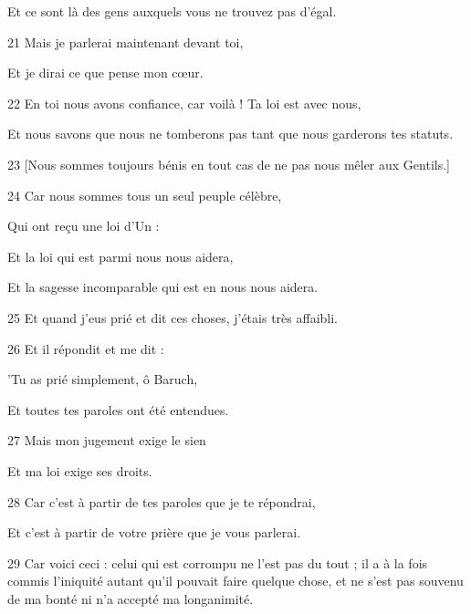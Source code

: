 \par Et ce sont là des gens auxquels vous ne trouvez pas d'égal.

\par 21 Mais je parlerai maintenant devant toi,

\par Et je dirai ce que pense mon cœur.

\par 22 En toi nous avons confiance, car voilà ! Ta loi est avec nous,

\par Et nous savons que nous ne tomberons pas tant que nous garderons tes statuts.

\par 23 [Nous sommes toujours bénis en tout cas de ne pas nous mêler aux Gentils.]

\par 24 Car nous sommes tous un seul peuple célèbre,

\par Qui ont reçu une loi d'Un :

\par Et la loi qui est parmi nous nous aidera,

\par Et la sagesse incomparable qui est en nous nous aidera.

\par 25 Et quand j'eus prié et dit ces choses, j'étais très affaibli.

\par 26 Et il répondit et me dit :

\par 'Tu as prié simplement, ô Baruch,

\par Et toutes tes paroles ont été entendues.

\par 27 Mais mon jugement exige le sien

\par Et ma loi exige ses droits.

\par 28 Car c'est à partir de tes paroles que je te répondrai,

\par Et c'est à partir de votre prière que je vous parlerai.

\par 29 Car voici ceci : celui qui est corrompu ne l'est pas du tout ; il a à la fois commis l'iniquité autant qu'il pouvait faire quelque chose, et ne s'est pas souvenu de ma bonté ni n'a accepté ma longanimité.

